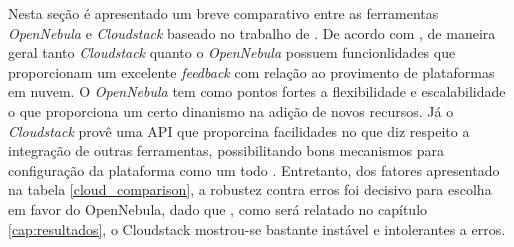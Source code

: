 Nesta seção é apresentado um breve comparativo entre as ferramentas \textit{OpenNebula} e \textit{Cloudstack} baseado no trabalho de . De acordo com , de maneira geral tanto \textit{Cloudstack} quanto o \textit{OpenNebula} possuem funcionlidades que proporcionam um excelente \textit{feedback} com relação ao provimento de plataformas em nuvem. O \textit{OpenNebula} tem como pontos fortes a flexibilidade e escalabilidade o que proporciona um certo dinanismo na adição de novos recursos. Já o \textit{Cloudstack} provê uma API que proporcina facilidades no que diz respeito a integração de outras ferramentas, possibilitando bons mecanismos para configuração da plataforma como um todo \cite{salam}. Entretanto, dos fatores apresentado na tabela \ref{cloud_comparison}, a robustez contra erros foi decisivo para escolha em favor do OpenNebula, dado que , como será relatado no capítulo \ref{cap:resultados}, o Cloudstack mostrou-se bastante instável e intolerantes a erros.


